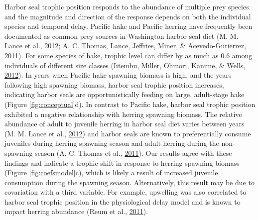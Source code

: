 \documentclass [11pt, proquest] {uwthesis}[2015/03/03]
\begin{document}
Harbor seal trophic position responds to the abundance of multiple prey
species and the magnitude and direction of the response depends on both
the individual species and temporal delay. Pacific hake and Pacific
herring have frequently been documented as common prey sources in
Washington harbor seal diet (M. M. Lance et al.,
\protect\hyperlink{ref-Lance2012}{2012}; A. C. Thomas, Lance, Jeffries,
Miner, \& Acevedo-Gutierrez, \protect\hyperlink{ref-Thomas2011}{2011}).
For some species of hake, trophic level can differ by as much as 0.6
among individuals of different size classes (Iitembu, Miller, Ohmori,
Kanime, \& Wells, \protect\hyperlink{ref-Iitembu2012}{2012}). In years
when Pacific hake spawning biomass is high, and the years following high
spawning biomass, harbor seal trophic position increases, indicating
harbor seals are opportunistically feeding on large, adult-stage hake
(Figure \ref{fig:conceptual}d). In contrast to Pacific hake, harbor seal
trophic position exhibited a negative relationship with herring spawning
biomass. The relative abundance of adult to juvenile herring in harbor
seal diet varies between years (M. M. Lance et al.,
\protect\hyperlink{ref-Lance2012}{2012}) and harbor seals are known to
preferentially consume juveniles during herring spawning season and
adult herring during the non-spawning season (A. C. Thomas et al.,
\protect\hyperlink{ref-Thomas2011}{2011}). Our results agree with these
findings and indicate a trophic shift in response to herring spawning
biomass (Figure \ref{fig:coefsmodel}c), which is likely a result of
increased juvenile consumption during the spawning season.
Alternatively, this result may be due to covariation with a third
variable. For example, upwelling was also correlated to harbor seal
trophic position in the physiological delay model and is known to impact
herring abundance (Reum et al., \protect\hyperlink{ref-Reum2011}{2011}).
\end{document}
